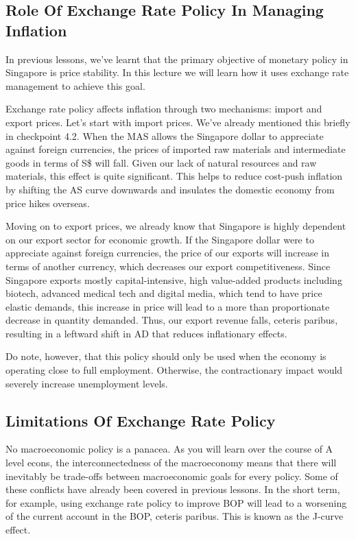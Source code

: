 \documentclass[DIV=classic,11pt,numbers=noenddot,parskip]{scrartcl}
\begin{document}
\subsection{Role Of Exchange Rate Policy In Managing Inflation}
In previous lessons, we’ve learnt that the primary objective of monetary policy in Singapore is price stability. In this lecture we will learn how it uses exchange rate management to achieve this goal.

Exchange rate policy affects inflation through two mechanisms: import and export prices. Let’s start with import prices. We’ve already mentioned this briefly in checkpoint 4.2. When the MAS allows the Singapore dollar to appreciate against foreign currencies, the prices of imported raw materials and intermediate goods in terms of S\$ will fall. Given our lack of natural resources and raw materials, this effect is quite significant. This helps to reduce cost-push inflation by shifting the AS curve downwards and insulates the domestic economy from price hikes overseas.

Moving on to export prices, we already know that Singapore is highly dependent on our export sector for economic growth. If the Singapore dollar were to appreciate against foreign currencies, the price of our exports will increase in terms of another currency, which decreases our export competitiveness. Since Singapore exports mostly capital-intensive, high value-added products including biotech, advanced medical tech and digital media, which tend to have price elastic demands, this increase in price will lead to a more than proportionate decrease in quantity demanded. Thus, our export revenue falls, ceteris paribus, resulting in a leftward shift in AD that reduces inflationary effects.

Do note, however, that this policy should only be used when the economy is operating close to full employment. Otherwise, the contractionary impact would severely increase unemployment levels.
\subsection{Limitations Of Exchange Rate Policy}
No macroeconomic policy is a panacea. As you will learn over the course of A level econs, the interconnectedness of the macroeconomy means that there will inevitably be trade-offs between macroeconomic goals for every policy. Some of these conflicts have already been covered in previous lessons. In the short term, for example, using exchange rate policy to improve BOP will lead to a worsening of the current account in the BOP, ceteris paribus. This is known as the J-curve effect.
\end{document}
